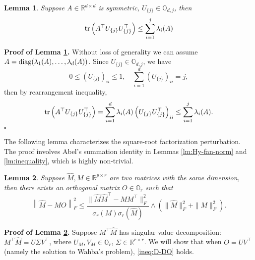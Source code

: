 \documentclass[11pt]{article}
\newtheorem{Lemma}{Lemma}
\newcommand{\0}{{\mathbf{0}}}
\newcommand{\1}{{\mathbf{1}}}
\newcommand{\tr}{{\rm tr}}
\newcommand{\diag}{{\rm diag}}
\begin{document}
\begin{Lemma}\label{lm:simple}
	Suppose $A\in \mathbb{R}^{d\times d}$ is symmetric, $U_{\{j\}}\in \mathbb{O}_{d, j}$, then
	\begin{equation*}
	\tr\left(A^\top U_{\{j\}}U_{\{j\}}^\top\right) \leq \sum_{i=1}^j \lambda_i(A)
	\end{equation*}
\end{Lemma}
{\bf \noindent Proof of Lemma \ref{lm:simple}.} Without loss of generality we can assume $A = \diag(\lambda_1(A), \ldots, \lambda_d(A))$. Since $U_{\{j\}}\in \mathbb{O}_{d, j}$, we have
$$0\leq (U_{\{j\}})_{ii} \leq 1,\quad  \sum_{i=1}^d (U_{\{j\}})_{ii} = j,$$
then by rearrangement inequality,
\begin{equation*}
\begin{split}
\tr\left(A^\top U_{\{j\}}U_{\{j\}}^\top\right) = \sum_{i=1}^d \lambda_i(A) \left(U_{\{j\}}U_{\{j\}}^\top\right)_{ii} \leq \sum_{i=1}^j \lambda_i(A).
\end{split}
\end{equation*}
\quad $\square$

The following lemma characterizes the square-root factorization perturbation. The proof involves Abel's summation identity in Lemmas \ref{lm:Hy-fan-norm} and \ref{lm:inequality}, which is highly non-trivial. 
\begin{Lemma}\label{lm:factorization-lemma}
	Suppose $\hat{M}, M\in \mathbb{R}^{p\times r}$ are two matrices with the same dimension, then there exists an orthogonal matrix $O\in \mathbb{O}_{r}$ such that
	\begin{equation}\label{ineq:D-DO}
	\left\| \hat{M} - MO\right\|_F^2 \leq \frac{\|\hat{M}\hat{M}^\top - MM^\top\|_F^2}{\sigma_r(M)\sigma_r(\hat{M})} \wedge \left(\|\hat{M}\|_F^2 + \|M\|_F^2\right).
	\end{equation}
\end{Lemma}

{\noindent\bf Proof of Lemma \ref{lm:factorization-lemma}.} Suppose $M^\top \hat{M}$ has singular value decomposition: $M^\top \hat{M} = U\Sigma V^\top$, where $U_M, V_M\in \mathbb{O}_r$, $\Sigma\in \mathbb{R}^{r\times r}$. We will show that when $O = UV^\top$ (namely the solution to Wahba's problem), \eqref{ineq:D-DO} holds. 
\end{document}
